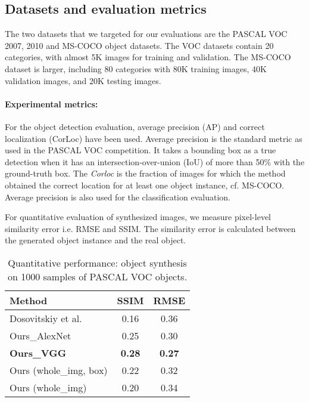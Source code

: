 \documentclass[runningheads]{llncs}
\begin{document}
\subsection{Datasets and evaluation metrics}

The two datasets that we targeted for our evaluations are the PASCAL VOC 2007, 2010 and MS-COCO object datasets. The VOC datasets contain 20 categories, with almost 5K images for training and validation. The MS-COCO dataset is larger, including 80 categories with 80K training images, 40K validation images, and 20K testing images.
\paragraph*{Experimental metrics:} For the object detection evaluation, average precision (AP) and correct localization (CorLoc) have been used. Average precision is the standard metric as used in the PASCAL VOC competition. It takes a bounding box as a true detection when it has an intersection-over-union (IoU) of more than 50$\%$ with the ground-truth box. The \textit{Corloc} is the fraction of images for which the method obtained the correct location for at least one object instance, cf. MS-COCO. Average precision is also used for the classification evaluation.

For quantitative evaluation of synthesized images, we measure pixel-level similarity error i.e. RMSE and SSIM. The similarity error is calculated between the generated object instance and the real object.


\begin{table}[htb]
{\small
\tabcolsep=0.3cm
\caption{Quantitative performance: object synthesis on 1000 samples of PASCAL VOC objects.}
\label{tab:1}
\begin{center}
\begin{tabular}{lcc}
\toprule 
Method & SSIM & RMSE \\
\midrule
Dosovitskiy et al.~\cite{dosovitskiy2} & 0.16& 0.36 \\
Ours\_AlexNet & 0.25 & 0.30   \\
\textbf{Ours\_VGG} & \textbf{0.28} & \textbf{0.27}   \\
\midrule
Ours (whole\_img, box) & 0.22 & 0.32   \\
Ours (whole\_img) & 0.20 & 0.34   \\
\bottomrule
\end{tabular}
\end{center}}
\vspace{-1cm}
 
\end{table}
\end{document}
